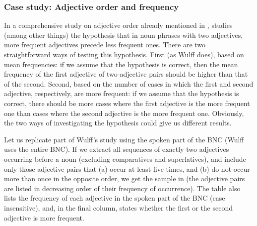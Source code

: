 \subsubsection{Case study: Adjective order and frequency}
\label{sec:adjectiveorderandfrequency}

In a comprehensive study on adjective  order already mentioned in , \citet{wulff_multifactorial_2003} studies (among other things) the hypothesis that in noun  phrases with two adjectives,  more frequent adjectives  precede less frequent ones. There are two straightforward ways of testing this hypothesis. First (as Wulff does), based on mean  frequencies:  if we assume that the hypothesis is correct, then the mean frequency of the first adjective  of two\hyp{}adjective pairs should be higher than that of the second. Second, based on the number of cases in which the first and second adjective,  respectively, are more frequent: if we assume that the hypothesis is correct, there should be more cases where the first adjective  is the more frequent one than cases where the second adjective  is the more frequent one. Obviously, the two ways of investigating the hypothesis could give us different results.

Let us replicate  part of Wulff's study using the spoken  part of the BNC  (Wulff uses the entire BNC). If we extract  all sequences of exactly two adjectives  occurring before a noun  (excluding comparatives and superlatives), and include only those adjective  pairs that (a) occur at least five times, and (b) do not occur more than once in the opposite order, we get the sample in  (the adjective  pairs are listed in decreasing order of their frequency  of occurrence). The table also lists the frequency of each adjective  in the spoken part of the BNC  (case insensitive), and, in the final column, states  whether the first or the second adjective  is more frequent.

